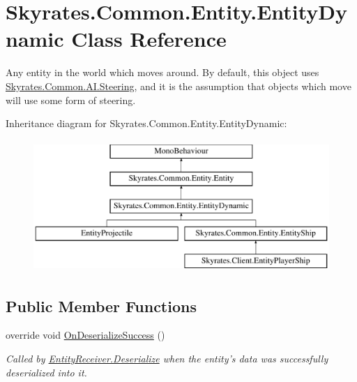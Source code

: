 \hypertarget{class_skyrates_1_1_common_1_1_entity_1_1_entity_dynamic}{\section{Skyrates.\-Common.\-Entity.\-Entity\-Dynamic Class Reference}
\label{class_skyrates_1_1_common_1_1_entity_1_1_entity_dynamic}
}


Any entity in the world which moves around. By default, this object uses \hyperlink{class_skyrates_1_1_common_1_1_a_i_1_1_steering}{Skyrates.\-Common.\-A\-I.\-Steering}, and it is the assumption that objects which move will use some form of steering.  


Inheritance diagram for Skyrates.\-Common.\-Entity.\-Entity\-Dynamic\-:\begin{figure}[H]
\begin{center}
\leavevmode
\includegraphics[height=5.000000cm]{class_skyrates_1_1_common_1_1_entity_1_1_entity_dynamic}
\end{center}
\end{figure}
\subsection*{Public Member Functions}
\begin{DoxyCompactItemize}
\item 
override void \hyperlink{class_skyrates_1_1_common_1_1_entity_1_1_entity_dynamic_aedeb63ce173df35eb21d75161d01028d}{On\-Deserialize\-Success} ()
\begin{DoxyCompactList}\small\item\em Called by \hyperlink{class_skyrates_1_1_common_1_1_entity_1_1_entity_receiver_a9da0b7c3a8b9e1ed7d10be74ce80482b}{Entity\-Receiver.\-Deserialize} when the entity's data was successfully deserialized into it. \end{DoxyCompactList}\end{DoxyCompactItemize}
